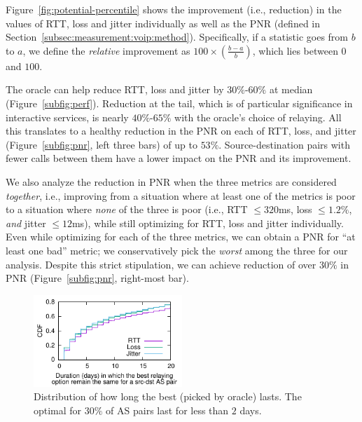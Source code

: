  Figure~\ref{fig:potential-percentile} shows the improvement (i.e., reduction) in the values of RTT, loss and jitter individually as well as the PNR (defined in Section~\ref{subsec:measurement:voip:method}). Specifically, if 
a statistic goes from  $b$ to $a$, we define the {{\em relative}} improvement as $100 \times (\frac{b-a}{b})$, which lies between $0$ and $100$. %

The oracle can help reduce RTT, loss and jitter by $30\%$-$60\%$ at median (Figure~\ref{subfig:perf}). Reduction at the tail, which is of particular significance in interactive services,
is nearly  $40\%$-$65\%$ with the oracle's choice of relaying. All this translates to a healthy reduction in the PNR on each of RTT, loss, and jitter (Figure~\ref{subfig:pnr}, left three bars) of up to $53\%$. Source-destination pairs with fewer calls between them have a lower impact on the PNR and its improvement. 

We also analyze the reduction in PNR when the three metrics are considered {\em together}, i.e., improving from a situation where at least one of the metrics is poor to a situation where {\em none} of the three is poor (i.e., RTT $\leq 320$ms, loss $\leq 1.2\%$, {\em and} jitter $\leq 12$ms), while still optimizing for RTT, loss and jitter individually. %
Even while optimizing for each of the three metrics, we can obtain a PNR for ``at least one bad'' metric; we conservatively pick the {\em worst} among the three for our analysis. Despite this strict stipulation, we can achieve reduction of over $30\%$ in PNR (Figure~\ref{subfig:pnr}, right-most bar).

\begin{figure}[t!]
\centering
\includegraphics[width=0.5\textwidth]{figures/Via-Potential-PersistenceOfOracleDecision.pdf}
\caption{Distribution of how long the best \option (picked by oracle) lasts. The optimal \options for $30\%$ of AS pairs last for less than $2$ days.}
\label{fig:potential-persistence}
\end{figure}

